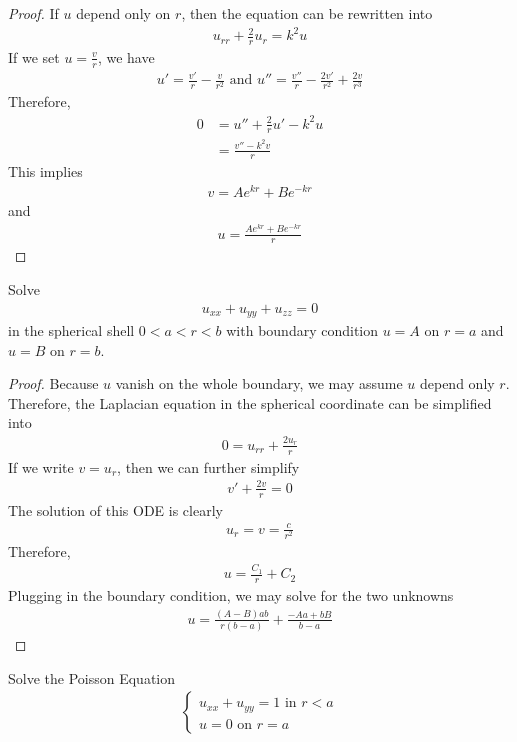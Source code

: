 \documentclass{report}
\begin{document}
\begin{proof}
If $u$ depend only on  $r$, then the equation can be rewritten into 
 \begin{align*}
u_{rr}+ \frac{2}{r}u_r= k^2u
\end{align*}
If we set $u=\frac{v}{r}$, we have 
\begin{align*}
u'= \frac{v'}{r}- \frac{v}{r^2} \text{ and } u''= \frac{v''}{r}- \frac{2v'}{r^2}+ \frac{2v}{r^3}
\end{align*}
Therefore, 
\begin{align*}
0&=u''+ \frac{2}{r}u' - k^2 u \\
&= \frac{v''- k^2 v}{r} 
\end{align*}
This implies 
\begin{align*}
v= Ae^{kr}+ Be^{-kr}
\end{align*}
and 
\begin{align*}
u= \frac{Ae^{kr}+ B e^{-kr}}{r}
\end{align*}
\end{proof}
\begin{question}{}{}
Solve 
\begin{align*}
u_{xx}+u_{yy}+u_{zz}=0
\end{align*}
in the spherical shell $0<a<r<b$ with
boundary condition $u=A$ on  $r=a$ and  $u=B$ on  $r=b$. 
\end{question}
\begin{proof}
Because $u$ vanish on the whole boundary, we may assume  $u$ depend only  $r$. Therefore, the Laplacian equation in the spherical coordinate can be simplified into 
 \begin{align*}
0=u_{rr} + \frac{2u_r}{r} 
\end{align*}
If we write $v=u_r$, then we can further simplify
 \begin{align*}
v'+ \frac{2v}{r}=0
\end{align*}
The solution of this ODE is clearly
\begin{align*}
u_r=v=\frac{c}{r^2}
\end{align*}
Therefore, 
\begin{align*}
u= \frac{C_1}{r}+ C_2
\end{align*}
Plugging in the boundary condition, we may solve for the two unknowns 
\begin{align*}
u= \frac{(A-B)ab}{r(b-a)} + \frac{-Aa + bB}{b-a}
\end{align*}
\end{proof}
\begin{question}{}{}
Solve the Poisson Equation
\begin{align*}
\begin{cases}
  u_{xx}+ u_{yy}=1 \text{ in }r<a \\
  u=0\text{ on }r=a
\end{cases}
\end{align*}
\end{question}
\end{document}
